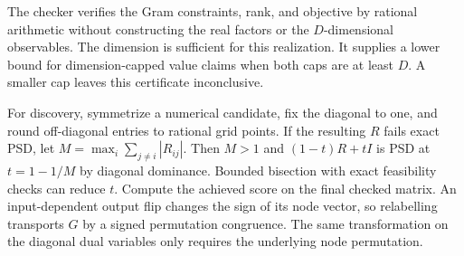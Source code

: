 The checker verifies the Gram constraints, rank, and objective by rational
arithmetic without constructing the real factors or the $D$-dimensional
observables. The dimension is sufficient for this realization. It supplies
a lower bound for dimension-capped value claims when both caps are at least
$D$. A smaller cap leaves this certificate inconclusive.

For discovery, symmetrize a numerical candidate, fix the diagonal to one,
and round off-diagonal entries to rational grid points. If the resulting $R$
fails exact PSD, let $M=\max_i\sum_{j\ne i}|R_{ij}|$. Then $M>1$ and
$(1-t)R+tI$ is PSD at $t=1-1/M$ by diagonal dominance. Bounded bisection
with exact feasibility checks can reduce $t$. Compute the achieved score on
the final checked matrix. An input-dependent output flip changes the sign of
its node vector, so relabelling transports $G$ by a signed permutation
congruence. The same transformation on the diagonal dual variables only
requires the underlying node permutation.
